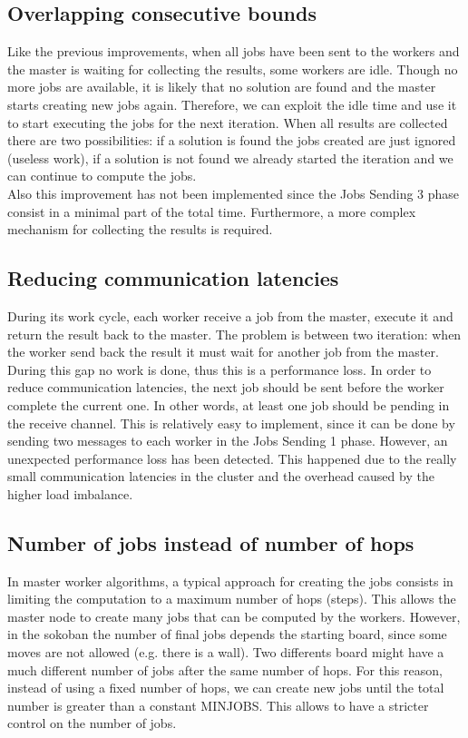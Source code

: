 \documentclass{article}
\begin{document}
\subsection{Overlapping consecutive bounds}
Like the previous improvements, when all jobs have been sent to the workers and the master is waiting for collecting the results, some workers are idle. Though no more jobs are available, it is likely that no solution are found and the master starts creating new jobs again. Therefore, we can exploit the idle time and use it to start executing the jobs for the next iteration. When all results are collected there are two possibilities: if a solution is found the jobs created are just ignored (useless work), if a solution is not found we already started the iteration and we can continue to compute the jobs. \\
Also this improvement has not been implemented since the Jobs Sending 3 phase consist in a minimal part of the total time. Furthermore, a more complex mechanism for collecting the results is required.


\subsection{Reducing communication latencies} \label{sec:reducinglatencies}
During its work cycle, each worker receive a job from the master, execute it and return the result back to the master. The problem is between two iteration: when the worker send back the result it must wait for another job from the master. During this gap no work is done, thus this is a performance loss. In order to reduce communication latencies, the next job should be sent before the worker complete the current one. In other words, at least one job should be pending in the receive channel. This is relatively easy to implement, since it can be done by sending two messages to each worker in the Jobs Sending 1 phase. However, an unexpected performance loss has been detected. This happened due to the really small communication latencies in the cluster and the overhead caused by the higher load imbalance.

\subsection{Number of jobs instead of number of hops}
In master worker algorithms, a typical approach for creating the jobs consists in limiting the computation to a maximum number of hops (steps). This allows the master node to create many jobs that can be computed by the workers. However, in the sokoban the number of final jobs depends the starting board, since some moves are not allowed (e.g. there is a wall). Two differents board might have a much different number of jobs after the same number of hops. For this reason, instead of using a fixed number of hops, we can create new jobs until the total number is greater than a constant MINJOBS. This allows to have a stricter control on the number of jobs.
\end{document}

